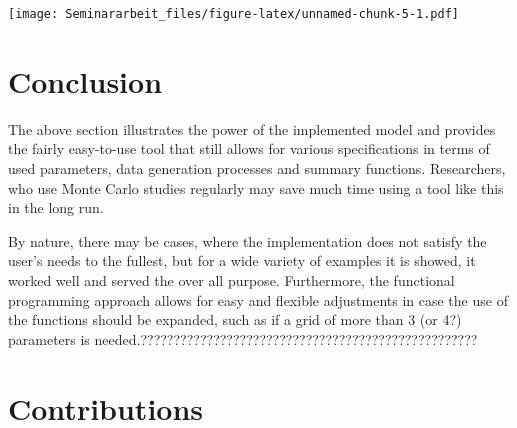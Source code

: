 \documentclass[11pt,a4paper]{article}
\newenvironment{Shaded}{\begin{snugshade}}{\end{snugshade}}
\newcommand{\AttributeTok}[1]{\textcolor[rgb]{0.77,0.63,0.00}{#1}}
\newcommand{\FunctionTok}[1]{\textcolor[rgb]{0.00,0.00,0.00}{#1}}
\newcommand{\NormalTok}[1]{#1}
\newcommand{\OtherTok}[1]{\textcolor[rgb]{0.56,0.35,0.01}{#1}}
\newcommand{\SpecialCharTok}[1]{\textcolor[rgb]{0.00,0.00,0.00}{#1}}
\newcommand{\StringTok}[1]{\textcolor[rgb]{0.31,0.60,0.02}{#1}}
\begin{document}
\begin{Shaded}
\end{Shaded}

\texttt{[image: Seminararbeit\_files/figure-latex/unnamed-chunk-5-1.pdf]}

\pagebreak

\hypertarget{conclusion}{%
\section{Conclusion}\label{conclusion}}

The above section illustrates the power of the implemented model and
provides the fairly easy-to-use tool that still allows for various
specifications in terms of used parameters, data generation processes
and summary functions. Researchers, who use Monte Carlo studies
regularly may save much time using a tool like this in the long run.

By nature, there may be cases, where the implementation does not satisfy
the user's needs to the fullest, but for a wide variety of examples it
is showed, it worked well and served the over all purpose. Furthermore,
the functional programming approach allows for easy and flexible
adjustments in case the use of the functions should be expanded, such as
if a grid of more than 3 (or 4?) parameters is
needed.???????????????????????????????????????????????????

\pagebreak

\hypertarget{contributions}{%
\section{Contributions}\label{contributions}}
\end{document}
